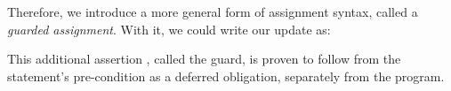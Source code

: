 \documentclass[sigplan]{acmart}%
\begin{document}
Therefore, we introduce a more general form of assignment syntax, called 
a \emph{guarded assignment}. With it, we could write our 
update as:
\begin{code}
\>[9]\AgdaSpace{}%
\AgdaSpace{}%
\AgdaSpace{}%
\AgdaOperator{\AgdaPrimitive{+}}\AgdaSpace{}%
\AgdaSymbol{(}\AgdaSpace{}%
\AgdaOperator{\AgdaFunction{!}}\AgdaSpace{}%
\AgdaSymbol{)}\AgdaSpace{}%
\AgdaSpace{}%
\AgdaSpace{}%
\AgdaSpace{}%
\AgdaSymbol{(}\AgdaSpace{}%
\AgdaOperator{\AgdaFunction{<}}\AgdaSpace{}%
\AgdaSpace{}%
\AgdaSymbol{)}\AgdaSpace{}%
\end{code}
This additional assertion  
\AgdaSymbol{(}\AgdaSpace{}%
\AgdaOperator{\AgdaFunction{<}}\AgdaSpace{}%
\AgdaSpace{}%
\AgdaSymbol{)}\AgdaSpace{}%
, called the guard, is proven to follow from the statement's pre-condition as a
deferred obligation, separately from the program.
\end{document}
